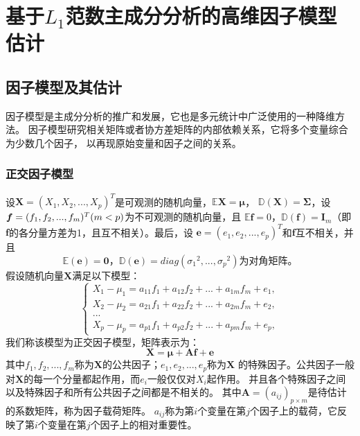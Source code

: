 \section{基于$L_1$范数主成分分析的高维因子模型估计}\label{chapter2}

\subsection{因子模型及其估计}
因子模型是主成分分析的推广和发展，它也是多元统计中广泛使用的一种降维方法。
因子模型研究相关矩阵或者协方差矩阵的内部依赖关系，它将多个变量综合为少数几个因子，
以再现原始变量和因子之间的关系。

\subsubsection{正交因子模型}

设$\bm{X} = (X_1, X_2, ..., X_p)^T$是可观测的随机向量，$\mathbb{E}\bm{X} = \bm{\mu}$，
$\mathbb{D}(\bm{X}) = \bm{\Sigma}$，设$\bm{f} = (f_1, f_2, ..., f_m)^T\\ (m <p)$为不可观测的随机向量，且
$\mathbb{E}\bm{f} = 0$，$\mathbb{D}(\bm{f}) = \bm{I}_m$（即$\bm{f}$的各分量方差为1，且互不相关）。最后，设
$\bm{e} = (e_1, e_2, ..., e_p)^T$和$\bm{f}$互不相关，并且
$$
    \mathbb{E}(\bm{e}) = \bm{0}\mbox{，}\mathbb{D}(\bm{e}) = diag({\sigma _1}^2, ..., {\sigma _p}^2)
    \mbox{为对角矩阵。}
$$
假设随机向量$\bm{X}$满足以下模型：
\begin{equation} \label{orth-factor}
\left\{
\begin{array}{clr}
    X_1 - \mu_1 = a_{11}f_1 + a_{12}f_2 + ... + a_{1m}f_m + e_1, \\
    X_2 - \mu_2 = a_{21}f_1 + a_{22}f_2 + ... + a_{2m}f_m + e_2, \\
    ... \\
    X_p - \mu_p = a_{p1}f_1 + a_{p2}f_2 + ... + a_{pm}f_m + e_p,
\end{array}
\right.
\end{equation}
我们称该模型为正交因子模型，矩阵表示为：
\begin{equation}
    \bm{X} = \bm{\mu} + \bm{A}\bm{f} + \bm{e}
\end{equation}
其中$f_1, f_2, ..., f_m$称为$\bm{X}$的公共因子；$e_1, e_2, ..., e_p$称为$\bm{X}$
的特殊因子。公共因子一般对$\bm{X}$的每一个分量都起作用，而$e_i$一般仅仅对$X_i$起作用。
并且各个特殊因子之间以及特殊因子和所有公共因子之间都是不相关的。
其中$\bm{A} = (a_{ij})_{p \times m}$是待估计的系数矩阵，称为因子载荷矩阵。
$a_{ij}$称为第$i$个变量在第$j$个因子上的载荷，它反映了第$i$个变量在第$j$个因子上的相对重要性。

